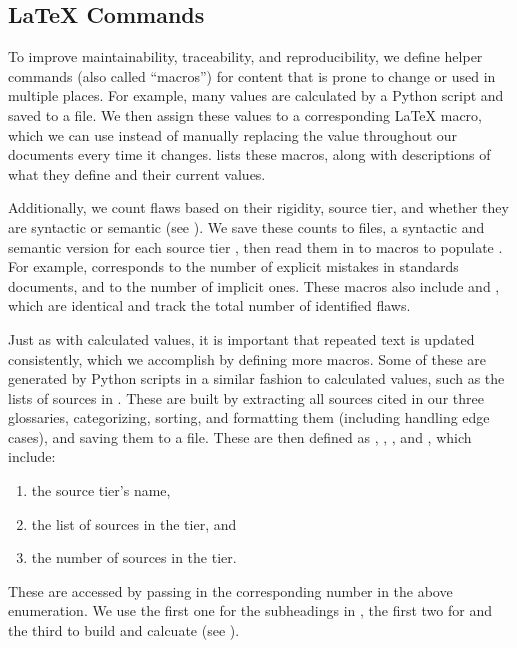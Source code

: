 \subsection[LaTeX Commands]{\LaTeX{} Commands}\label{macros}
To improve maintainability, traceability, and reproducibility, we define
helper commands (also called ``macros'') for content that is prone to change
or used in multiple places. For example, many values are calculated by a Python
script and saved to a file. We then assign these values to a corresponding
\LaTeX{} macro, which we can use instead of manually replacing the value
throughout our documents every time it changes.  lists
these macros, along with descriptions of what they define and their current
values.



\label{flawCounts}
Additionally, we count flaws based on their rigidity, source tier,
and whether they are syntactic or semantic (see
).
We save these counts to files, a syntactic and semantic version for each
source tier%
, then read them in to macros
to populate . For example,
 corresponds to the number of explicit mistakes in
standards documents, and  to the number of implicit
ones. These macros also include  and \newline
{}, which are identical and
track the total number of identified flaws.

\label{text-macros}
Just as with calculated values, it is important that repeated text is updated
consistently, which we accomplish by defining more macros. Some of these are
generated by Python scripts in a similar fashion to calculated values, such as
the lists of sources in . These are built by extracting all
sources cited in our three glossaries, categorizing, sorting, and formatting
them (including handling edge cases), and saving them to a file. These are then
defined as , , , and
, which include:
\begin{enumerate}
    \item the source tier's name,
    \item the list of sources in the tier, and
    \item the number of sources in the tier.
\end{enumerate}
These are accessed by passing in the corresponding number in the above
enumeration. We use the first one for the subheadings in , the
first two for  and the third to build 
and calcuate  (see ).

